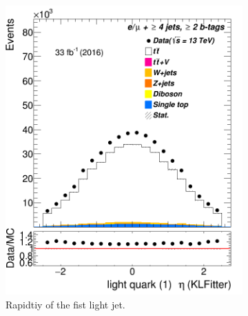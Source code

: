 \begin{figure}
	\medskip
	\begin{subfigure}{0.35\textwidth}
		\includegraphics[width=\linewidth]{ControlPlots_emujets_2016_4incl_2incl/klf_lq1_eta_emujets_2016.png}
		\caption{Rapidtiy of the fist light jet.} \label{fig:klf8}
	\end{subfigure}
	\hspace*{1.5cm}
	\begin{subfigure}{0.35\textwidth}

\end{subfigure}
\end{figure}
